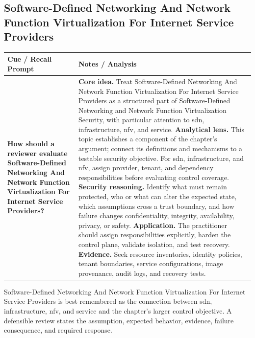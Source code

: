 \documentclass[11pt]{article}
\newcommand{\CornellHeader}{%
\rowcolor{Navy}\color{white}\bfseries Cue / Recall Prompt & \color{white}\bfseries Notes / Analysis\\\hline}
\newcommand{\CornellRow}[2]{%
\cellcolor{CueGray}\RaggedRight\textbf{#1} & \RaggedRight #2\\\hline}
\begin{document}
\subsection*{Software-Defined Networking And Network Function Virtualization For Internet Service Providers}
\begin{longtable}{>{\RaggedRight\arraybackslash}p{}|>{\RaggedRight\arraybackslash}p{}}
\CornellHeader
\CornellRow{How should a reviewer evaluate Software-Defined Networking And Network Function Virtualization For Internet Service Providers?}{\textbf{Core idea.} Treat Software-Defined Networking And Network Function Virtualization For Internet Service Providers as a structured part of Software-Defined Networking and Network Function Virtualization Security, with particular attention to sdn, infrastructure, nfv, and service. \textbf{Analytical lens.} This topic establishes a component of the chapter's argument; connect its definitions and mechanisms to a testable security objective. For sdn, infrastructure, and nfv, assign provider, tenant, and dependency responsibilities before evaluating control coverage. \textbf{Security reasoning.} Identify what must remain protected, who or what can alter the expected state, which assumptions cross a trust boundary, and how failure changes confidentiality, integrity, availability, privacy, or safety. \textbf{Application.} The practitioner should assign responsibilities explicitly, harden the control plane, validate isolation, and test recovery. \textbf{Evidence.} Seek resource inventories, identity policies, tenant boundaries, service configurations, image provenance, audit logs, and recovery tests.}
\end{longtable}
\begin{topicsummary}
Software-Defined Networking And Network Function Virtualization For Internet Service Providers is best remembered as the connection between sdn, infrastructure, nfv, and service and the chapter's larger control objective. A defensible review states the assumption, expected behavior, evidence, failure consequence, and required response.
\end{topicsummary}
\end{document}
